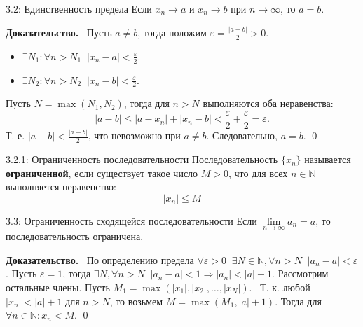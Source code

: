 \documentclass[a4paper,12pt]{article}
\newcommand{\myproof}{\textbf{Доказательство.}\ }
\begin{document}
	\begin{theorembox}{3.2: Единственность предела}
	Если $x_n \to a$ и $x_n \to b$ при $n \to \infty$, то $a = b$.
	\end{theorembox}
	
	\myproof
	Пусть $a \neq b$, тогда положим $\varepsilon = \frac{|a-b|}{2} > 0$.
	\begin{itemize}
	\item $\exists N_1 \colon \forall n > N_1 \;\; |x_n - a| < \frac{\varepsilon}{2}$.
	\item $\exists N_2 \colon \forall n > N_2 \;\; |x_n - b| < \frac{\varepsilon}{2}$.
	\end{itemize}
	Пусть $N = \max(N_1, N_2)$, тогда для $n > N$ выполняются оба неравенства:
	\[ |a-b| \le |a - x_n| + |x_n - b| < \frac{\varepsilon}{2} + \frac{\varepsilon}{2} = \varepsilon \text{.} \]
	Т. е. $|a-b| < \frac{|a-b|}{2}$, что невозможно при $a \neq b$. Следовательно, $a=b$. \qed
	
	\begin{center}
	\end{center}
	
	\begin{definitionbox}{3.2.1: Ограниченность последовательности}
	Последовательность $\{x_n\}$ называется \textbf{ограниченной}, если существует такое число $M > 0$, что для всех $n \in \mathbb{N}$ выполняется неравенство:
	\[ |x_n| \le M \]
	\end{definitionbox}
	
	\begin{theorembox}{3.3: Ограниченность сходящейся последовательности}
	Если $\lim\limits_{n \to \infty} a_n = a$, то последовательность ограничена.
	\end{theorembox}
	
	\myproof
	По определению предела $\forall \varepsilon > 0 \;\; \exists N \in \mathbb{N}, \forall n > N \;\; |a_n - a| < \varepsilon$.
	Пусть $\varepsilon = 1$, тогда $\exists N, \forall n > N \;\; |a_n - a| < 1 \Rightarrow |a_n| < |a| + 1$.
	Рассмотрим остальные члены. Пусть $M_1 = \max(|x_1|, |x_2|, \dots, |x_N|)$. 
	Т. к. любой $|x_n| < |a|+1$ для $n > N$, то возьмем $M = \max(M_1, |a|+1)$. Тогда для $\forall n \in \mathbb{N} \colon x_n < M$. \qed
	
\end{document}
